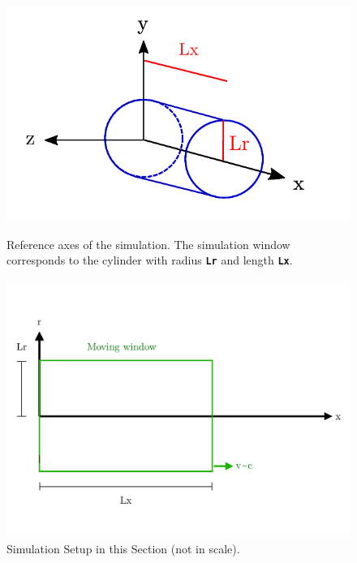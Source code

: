 \documentclass[a4paper,12pt]{extarticle}
\newcommand{\commandline}[1]{\texttt{\textbf{#1}}}
\begin{document}
\begin{figure}[!htb]
   \begin{minipage}{0.35\textwidth}
     \centering
     \includegraphics[width=1\linewidth]{Reference.pdf}
     \caption{Reference axes of the simulation. The simulation window corresponds to the cylinder with radius \commandline{Lr} and length \commandline{Lx}. }\label{reference_axes}
   \end{minipage}\hfill
   \begin{minipage}{0.65\textwidth}
     \centering
     \includegraphics[width=1\linewidth]{Schema_Simulation_0.pdf}
     \caption{Simulation Setup in this Section (not in scale).}\label{Schema0}
   \end{minipage}
\end{figure}
\end{document}
